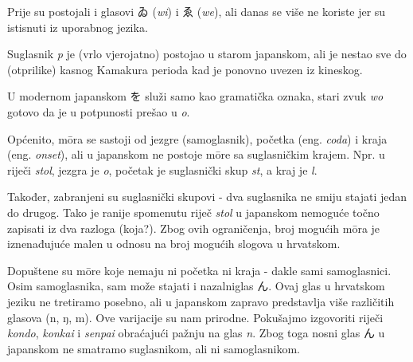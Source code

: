 	
	Prije su postojali i glasovi ゐ (\textit{wi}) i ゑ (\textit{we}), ali danas se više ne koriste jer su istisnuti iz uporabnog jezika.
	
	Suglasnik \textit{p} je (vrlo vjerojatno) postojao u starom japanskom, ali je nestao sve do (otprilike) kasnog Kamakura perioda kad je ponovno uvezen iz kineskog.
	
	U modernom japanskom を služi samo kao gramatička oznaka, stari zvuk \textit{wo} gotovo da je u potpunosti prešao u \textit{o}.
	
	\newpage
	
	Općenito, m\={o}ra se sastoji od jezgre (samoglasnik), početka (eng. \textit{coda}) i kraja (eng. \textit{onset}), ali u japanskom ne postoje m\={o}re sa suglasničkim krajem. Npr. u riječi \textit{stol}, jezgra je \textit{o}, početak je suglasnički skup \textit{st}, a kraj je \textit{l}.
	
	Također, zabranjeni su suglasnički skupovi - dva suglasnika ne smiju stajati jedan do drugog. Tako je ranije spomenutu riječ \textit{stol} u japanskom nemoguće točno zapisati iz dva razloga (koja?). Zbog ovih ograničenja, broj mogućih m\={o}ra je iznenađujuće malen u odnosu na broj mogućih slogova u hrvatskom.
	
	Dopuštene su m\={o}re koje nemaju ni početka ni kraja - dakle sami samoglasnici. Osim samoglasnika, sam može stajati i nazalni\footnotemark[1] glas ん. Ovaj glas u hrvatskom jeziku ne tretiramo posebno, ali u japanskom zapravo predstavlja više različitih glasova (n, ŋ, m). Ove varijacije su nam prirodne. Pokušajmo izgovoriti riječi \textit{kondo}, \textit{konkai} i \textit{senpai} obraćajući pažnju na glas \textit{n}. Zbog toga nosni glas ん u japanskom ne smatramo suglasnikom, ali ni samoglasnikom.
